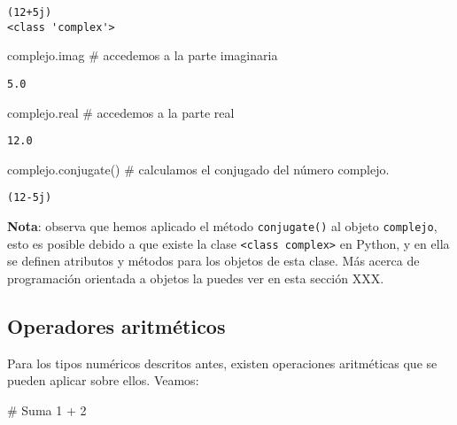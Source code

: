 \documentclass[
  letterpaper,
  DIV=11,
  numbers=noendperiod]{scrreprt}
\newenvironment{Shaded}{\begin{snugshade}}{\end{snugshade}}
\newcommand{\CommentTok}[1]{\textcolor[rgb]{0.37,0.37,0.37}{#1}}
\newcommand{\DecValTok}[1]{\textcolor[rgb]{0.68,0.00,0.00}{#1}}
\newcommand{\NormalTok}[1]{\textcolor[rgb]{0.00,0.23,0.31}{#1}}
\newcommand{\OperatorTok}[1]{\textcolor[rgb]{0.37,0.37,0.37}{#1}}
\begin{document}
\begin{verbatim}
(12+5j)
<class 'complex'>
\end{verbatim}

\begin{Shaded}
\begin{Highlighting}[]
\NormalTok{complejo.imag }\CommentTok{\# accedemos a la parte imaginaria}
\end{Highlighting}
\end{Shaded}

\begin{verbatim}
5.0
\end{verbatim}

\begin{Shaded}
\begin{Highlighting}[]
\NormalTok{complejo.real }\CommentTok{\# accedemos a la parte real}
\end{Highlighting}
\end{Shaded}

\begin{verbatim}
12.0
\end{verbatim}

\begin{Shaded}
\begin{Highlighting}[]
\NormalTok{complejo.conjugate() }\CommentTok{\# calculamos el conjugado del número complejo.}
\end{Highlighting}
\end{Shaded}

\begin{verbatim}
(12-5j)
\end{verbatim}

\textbf{Nota}: observa que hemos aplicado el método \texttt{conjugate()}
al objeto \texttt{complejo}, esto es posible debido a que existe la
clase
\texttt{\textless{}class\ \textquotesingle{}complex\textquotesingle{}\textgreater{}}
en Python, y en ella se definen atributos y métodos para los objetos de
esta clase. Más acerca de programación orientada a objetos la puedes ver
en esta sección XXX.

\subsection{Operadores aritméticos}\label{operadores-aritmuxe9ticos}

Para los tipos numéricos descritos antes, existen operaciones
aritméticas que se pueden aplicar sobre ellos. Veamos:

\begin{Shaded}
\begin{Highlighting}[]
\CommentTok{\# Suma}
\DecValTok{1} \OperatorTok{+} \DecValTok{2}
\end{Highlighting}
\end{Shaded}
\end{document}
